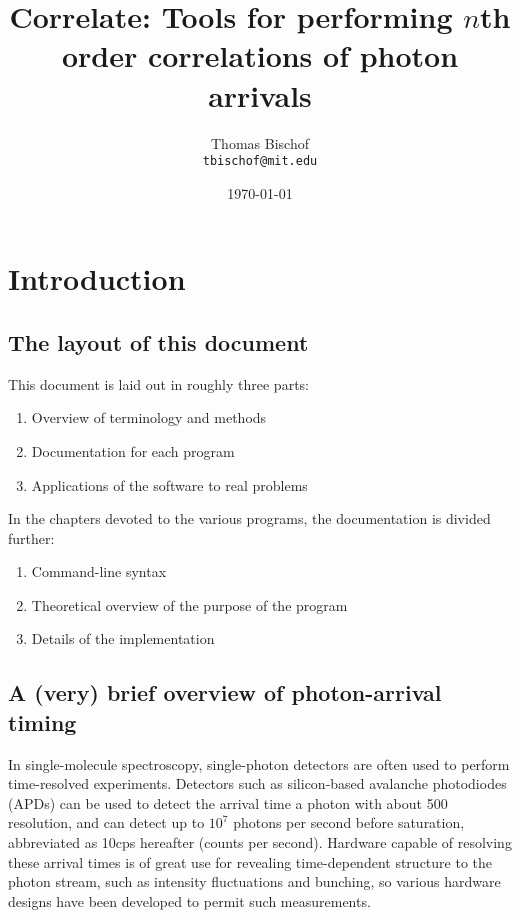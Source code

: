 \documentclass{article}
\title{Correlate: Tools for performing $n$th order correlations of photon arrivals}
\author{Thomas Bischof \\ \texttt{tbischof@mit.edu}}
\date{\today}
\newcommand{\cps}{\textnormal{cps}}
\begin{document}
\maketitle
\tableofcontents
 
\section{Introduction}
\subsection{The layout of this document}
This document is laid out in roughly three parts:
\begin{enumerate}
\item Overview of terminology and methods
\item Documentation for each program
\item Applications of the software to real problems
\end{enumerate}
In the chapters devoted to the various programs, the documentation is divided further:
\begin{enumerate}
\item Command-line syntax
\item Theoretical overview of the purpose of the program
\item Details of the implementation
\end{enumerate}

\subsection{A (very) brief overview of photon-arrival timing}
In single-molecule spectroscopy, single-photon detectors are often used to perform time-resolved experiments. Detectors such as silicon-based avalanche photodiodes (APDs) can be used to detect the arrival time a photon with about 500\pico\second{} resolution, and can detect up to $10^{7}$ photons per second before saturation, abbreviated as 10\mega\cps{} hereafter (counts per second). Hardware capable of resolving these arrival times is of great use for revealing time-dependent structure to the photon stream, such as intensity fluctuations and bunching, so various hardware designs have been developed to permit such measurements.
\end{document}
